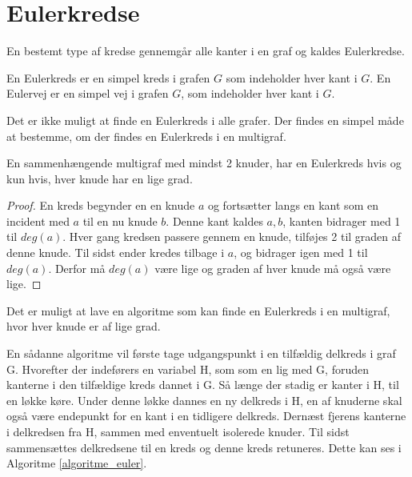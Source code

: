 \section{Eulerkredse}

En bestemt type af kredse gennemgår alle kanter i en graf og kaldes Eulerkredse. 

\begin{defn}\label{euler_def}
En Eulerkreds er en simpel kreds i grafen $G$ som indeholder hver kant i $G$.
En Eulervej er en simpel vej i grafen $G$, som indeholder hver kant i $G$.  
\end{defn}

\noindent Det er ikke muligt at finde en Eulerkreds i alle grafer. 
Der findes en simpel måde at bestemme, om der findes en Eulerkreds i en multigraf. 

\begin{thm}\label{Euler_multigraf}
En sammenhængende multigraf med mindst 2 knuder, har en Eulerkreds hvis og kun hvis, hver knude har en lige grad.
\end{thm}

\begin{proof} 
En kreds begynder en en knude $a$ og fortsætter langs en kant som en incident med $a$ til en nu knude $b$. 
Denne kant kaldes ${a,b}$, kanten bidrager med 1 til $deg(a)$. 
Hver gang kredsen passere gennem en knude, tilføjes 2 til graden af denne knude. 
Til sidst ender kredes tilbage i $a$, og bidrager igen med 1 til $deg(a)$. 
Derfor må $deg(a)$ være lige og graden af hver knude må også være lige.  
\end{proof} 

\noindent Det er muligt at lave en algoritme som kan finde en Eulerkreds i en multigraf, hvor hver knude er af lige grad.

En sådanne algoritme vil første tage udgangspunkt i en tilfældig delkreds i graf G. 
Hvorefter der indeførers en variabel H, som som en lig med G, foruden kanterne i den tilfældige kreds dannet i G. 
Så længe der stadig er kanter i H, til en løkke køre. 
Under denne løkke dannes en ny delkreds i H, en af knuderne skal også være endepunkt for en kant i en tidligere delkreds.
Dernæst fjerens kanterne i delkredsen fra H, sammen med enventuelt isolerede knuder. 
Til sidst sammensættes delkredsene til en kreds og denne kreds retuneres.
Dette kan ses i Algoritme \ref{algoritme_euler}.  

